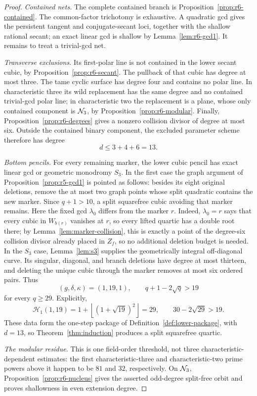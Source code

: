 \begin{proof}
\emph{Contained nets.}
The complete contained branch is
Proposition~\ref{prop:r6-contained}.
The common-factor trichotomy is exhaustive.  A quadratic gcd gives the
persistent tangent and conjugate-secant loci, together with the shallow
rational secant; an exact linear gcd is shallow by
Lemma~\ref{lem:r6-gcd1}.  It remains to treat a trivial-gcd net.

\emph{Transverse exclusions.}
Its first-polar line is not contained in the lower secant cubic, by
Proposition~\ref{prop:r6-secant}.  The pullback of that cubic has degree
at most three.  The tame cyclic surface has degree four and contains
no polar line.  In characteristic three its wild replacement has the
same degree and no contained trivial-gcd polar line; in characteristic
two the replacement is a plane, whose only contained component is
\(\mathcal N_3\), by Proposition~\ref{prop:r6-modular}.  Finally,
Proposition~\ref{prop:r6-degrees} gives a nonzero collision
divisor of degree at most six.  Outside the contained binary component,
the excluded parameter scheme therefore has degree
\[
                         d\leq3+4+6=13.
\]

\emph{Bottom pencils.}
For every remaining marker, the lower cubic pencil has exact linear
gcd or geometric monodromy \(S_3\).  In the first case the graph
argument of Proposition~\ref{prop:r5-gcd1} is pointed as follows:
besides its eight original deletions, remove the at most two graph
points whose split quadratic contains the new marker.  Since
\(q+1>10\), a split squarefree cubic avoiding that marker remains.
Here the fixed gcd \(\lambda_0\) differs from the marker \(r\).
Indeed, \(\lambda_0=r\) says that every cubic in \(W_{b(r)}\)
vanishes at \(r\), so every lifted quartic has a double root there;
by Lemma~\ref{lem:marker-collision}, this is exactly a point of the
degree-six collision divisor already placed in \(Z_f\), so no
additional deletion budget is needed.
In the \(S_3\) case, Lemma~\ref{lem:s3} supplies the geometrically
integral off-diagonal curve.  Its singular, diagonal, and branch
deletions have degree at most thirteen, and deleting the unique cubic
through the marker removes at most six ordered pairs.  Thus
\[
 (g,\delta,\kappa)=(1,19,1),\qquad q+1-2\sqrt q>19
\]
for every \(q\geq29\).  Explicitly,
\[
\mathcal H_1(1,19)
 =1+\left\lfloor(1+\sqrt{19})^2\right\rfloor=29,
\qquad 30-2\sqrt{29}>19.
\]
These data form the one-step package of
Definition~\ref{def:lower-package}, with \(d=13\), so
Theorem~\ref{thm:induction} produces a split squarefree quartic.

\emph{The modular residue.}
This is one field-order threshold, not three characteristic-dependent
estimates: the first characteristic-three and characteristic-two
prime powers above it happen to be \(81\) and \(32\), respectively.
On \(\mathcal N_3\),
Proposition~\ref{prop:r6-nucleus} gives the asserted odd-degree
split-free orbit and proves shallowness in even extension degree.
\end{proof}

